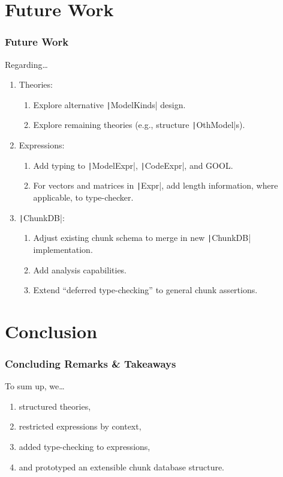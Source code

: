 \documentclass[xcolor={dvipsnames}]{beamer}
\newcommand{\inlineHs}[1]{\texttt|#1|}
\begin{document}
\section{Future Work}

\begin{frame}
  \frametitle{Future Work}

  Regarding\ldots{}
  \begin{enumerate}
    \item Theories:
      \begin{enumerate}
        \item Explore alternative \inlineHs{ModelKinds} design.
        \item Explore remaining theories (e.g., structure \inlineHs{OthModel}s).
      \end{enumerate}
    \item Expressions:
      \begin{enumerate}
        \item Add typing to \inlineHs{ModelExpr}, \inlineHs{CodeExpr}, and GOOL.
        \item For vectors and matrices in \inlineHs{Expr}, add length
              information, where applicable, to type-checker.
      \end{enumerate}
    \item \inlineHs{ChunkDB}:
      \begin{enumerate}
        \item Adjust existing chunk schema to merge in new \inlineHs{ChunkDB}
              implementation.
        \item Add analysis capabilities.
        \item Extend ``deferred type-checking'' to general chunk assertions.
      \end{enumerate}
  \end{enumerate}

\end{frame}

\section{Conclusion}

\begin{frame}
  \frametitle{Concluding Remarks \& Takeaways}

  To sum up, we\ldots{}
  \begin{enumerate}
    \item structured theories,
    \item restricted expressions by context,
    \item added type-checking to expressions,
    \item and prototyped an extensible chunk database structure.
  \end{enumerate}
\end{frame}
\end{document}
